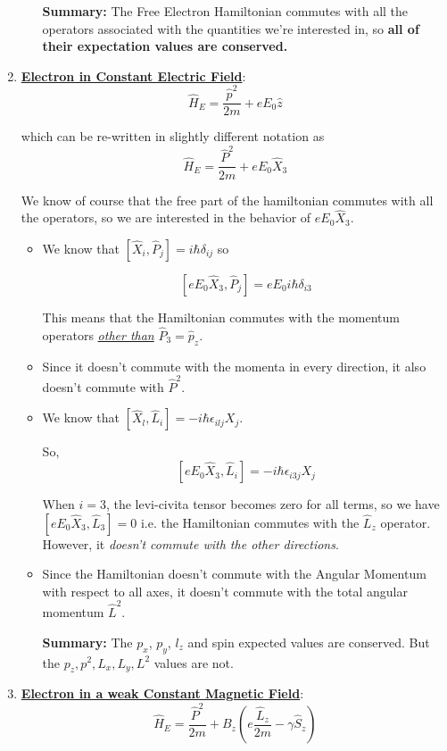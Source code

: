 \documentclass{article}
\begin{document}
\begin{enumerate}[label=(\alph*)]
\begin{itemize}
    \vskip 0.5cm
    \textbf{Summary:} The Free Electron Hamiltonian commutes with all the operators associated with the quantities we're interested in, so \textbf{all of their expectation values are conserved.}
  \end{itemize}

  \vskip 1cm
  \item \underline{\textbf{Electron in Constant Electric Field}}:
  \[ \hat{H}_E = \frac{\hat{p}^2}{2m} + eE_0\hat{z}  \]

  which can be re-written in slightly different notation as 
  \[ \hat{H}_E = \frac{\hat{P}^2}{2m} + eE_0\hat{X}_3 \]

  We know of course that the free part of the hamiltonian commutes with all the operators, so we are interested in the behavior of $eE_0 \hat{X}_3$.

  \begin{itemize}
    \item We know that $[\hat{X}_i, \hat{P}_j] = i\hbar\delta_{ij}$ so 
    
    \[[eE_0 \hat{X}_3, \hat{P}_j] = eE_0 i \hbar \delta_{i3}\] 
    
    This means that the Hamiltonian commutes with the momentum operators \underline{\emph{other than}} $\hat{P}_3 = \hat{p}_z$.
    \item Since it doesn't commute with the momenta in every direction, it also doesn't commute with $\hat{P}^2$.
    \item We know that $[\hat{X}_l, 
    \hat{L}_i] = -i \hbar \epsilon_{ilj} X_j$. 
    
    So, \[ [e E_0 \hat{X}_3, 
    \hat{L}_i] = -i \hbar \epsilon_{i3j} X_j \]

    When $i = 3$, the levi-civita tensor becomes zero for all terms, so we have $[e E_0 \hat{X}_3, 
    \hat{L}_3] = 0$ i.e. the Hamiltonian commutes with the $\hat{L}_z$ operator. However, it \emph{doesn't commute with the other directions}.

    \item Since the Hamiltonian doesn't commute with the Angular Momentum with respect to all axes, it doesn't commute with the total angular momentum $\hat{L}^2$.
    
    \vskip 0.5cm
    \textbf{Summary:} The $p_x$, $p_y$, $l_z$ and spin expected values are conserved. But the $p_z, p^2, L_x, L_y, L^2$ values are not.
  \end{itemize}

  \vskip 1cm
  \item \underline{\textbf{Electron in a weak Constant Magnetic Field}}:
  \[ \hat{H}_E = \frac{\hat{P}^2}{2m}  + B_z \left( e \frac{\hat{L}_z}{2m} - \gamma \hat{S}_z\right) \]
  

\end{enumerate}
\end{document}
